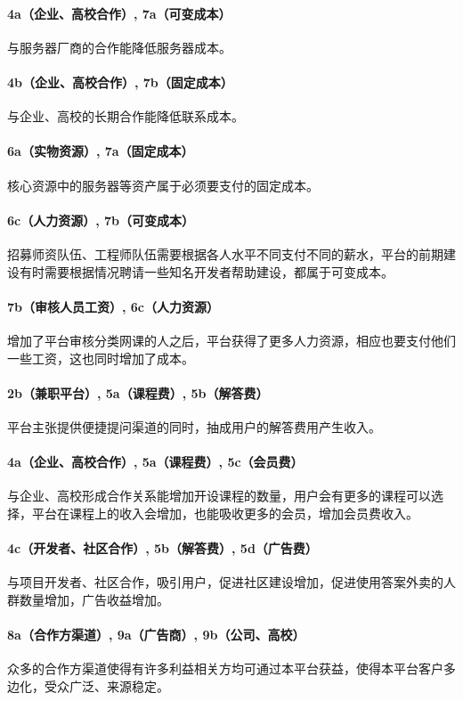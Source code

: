\documentclass[a4paper]{ctexart}
\begin{document}
\paragraph{4a（企业、高校合作）, 7a（可变成本）}与服务器厂商的合作能降低服务器成本。
\paragraph{4b（企业、高校合作）, 7b（固定成本）}与企业、高校的长期合作能降低联系成本。
\paragraph{6a（实物资源）, 7a（固定成本）}核心资源中的服务器等资产属于必须要支付的固定成本。
\paragraph{6c（人力资源）, 7b（可变成本）}招募师资队伍、工程师队伍需要根据各人水平不同支付不同的薪水，平台的前期建设有时需要根据情况聘请一些知名开发者帮助建设，都属于可变成本。
\paragraph{7b（审核人员工资）, 6c（人力资源）}增加了平台审核分类网课的人之后，平台获得了更多人力资源，相应也要支付他们一些工资，这也同时增加了成本。
\paragraph{2b（兼职平台）, 5a（课程费）, 5b（解答费）}平台主张提供便捷提问渠道的同时，抽成用户的解答费用产生收入。
\paragraph{4a（企业、高校合作）, 5a（课程费）, 5c（会员费）}与企业、高校形成合作关系能增加开设课程的数量，用户会有更多的课程可以选择，平台在课程上的收入会增加，也能吸收更多的会员，增加会员费收入。
\paragraph{4c（开发者、社区合作）, 5b（解答费）, 5d（广告费）}与项目开发者、社区合作，吸引用户，促进社区建设增加，促进使用答案外卖的人群数量增加，广告收益增加。
\paragraph{8a（合作方渠道）, 9a（广告商）, 9b（公司、高校）}众多的合作方渠道使得有许多利益相关方均可通过本平台获益，使得本平台客户多边化，受众广泛、来源稳定。
\end{document}
